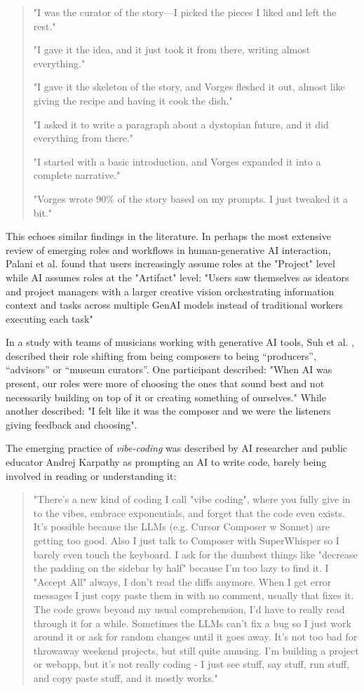 \begin{quote}
"I was the curator of the story—I picked the pieces I liked and left the rest."

"I gave it the idea, and it just took it from there, writing almost everything."

"I gave it the skeleton of the story, and Vorges fleshed it out, almost like giving the recipe and having it cook the dish." 

"I asked it to write a paragraph about a dystopian future, and it did everything from there." 

"I started with a basic introduction, and Vorges expanded it into a complete narrative." 

"Vorges wrote 90\% of the story based on my prompts. I just tweaked it a bit."
\end{quote}

This echoes similar findings in the literature. In perhaps the most extensive review of emerging roles and workflows in human-generative AI interaction, Palani et al. \cite{Palani2024-on} found that users increasingly assume roles at the "Project" level while AI assumes roles at the "Artifact" level: "Users saw themselves as ideators and project managers with a larger creative vision orchestrating information context and tasks across multiple GenAI models instead of traditional workers executing each task"

In a study with teams of musicians working with generative AI tools, Suh et al. \cite{Suh2021-cj}, described their role shifting from being composers to being “producers”, “advisors” or “museum curators”. One participant described: "When AI was present, our roles were more of choosing the ones that sound best and not necessarily building on top of it or creating something of ourselves." While another described: "I felt like it was the composer and we were the listeners giving feedback and choosing". 

The emerging practice of \textit{vibe-coding} was described by AI researcher and public educator Andrej Karpathy as prompting an AI to write code, barely being involved in reading or understanding it:

\begin{quote}
"There's a new kind of coding I call "vibe coding", where you fully give in to the vibes, embrace exponentials, and forget that the code even exists. It's possible because the LLMs (e.g. Cursor Composer w Sonnet) are getting too good. Also I just talk to Composer with SuperWhisper so I barely even touch the keyboard. I ask for the dumbest things like "decrease the padding on the sidebar by half" because I'm too lazy to find it. I "Accept All" always, I don't read the diffs anymore. When I get error messages I just copy paste them in with no comment, usually that fixes it. The code grows beyond my usual comprehension, I'd have to really read through it for a while. Sometimes the LLMs can't fix a bug so I just work around it or ask for random changes until it goes away. It's not too bad for throwaway weekend projects, but still quite amusing. I'm building a project or webapp, but it's not really coding - I just see stuff, say stuff, run stuff, and copy paste stuff, and it mostly works."
\end{quote}

